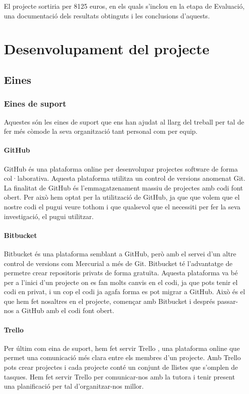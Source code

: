 \documentclass[12pt,a4paper,catalan]{article}
\begin{document}
El projecte sortiria per 8125 euros, en els quals s'inclou en la etapa de Evaluació, una documentació dels resultats obtinguts i les conclusions d'aquests.

\newpage

\section{Desenvolupament del projecte}
\subsection{Eines}
\subsubsection{Eines de suport}
Aquestes són les eines de suport que ens han ajudat al llarg del treball per tal de fer més còmode la seva organització tant personal com per equip.

\paragraph{GitHub}
GitHub \cite{github} és una plataforma online per desenvolupar projectes software de forma col·laborativa. Aquesta plataforma utilitza un control de versions anomenat Git. La finalitat de GitHub és l'emmagatzenament massiu de projectes amb codi font obert. Per això hem optat per la utilització de GitHub, ja que que volem que el nostre codi el pugui veure tothom i que qualsevol que el necessiti per fer la seva investigació, el pugui utilitzar.

\paragraph{Bitbucket}
Bitbucket \cite{bitbucket} és una plataforma semblant a GitHub, però amb el servei d'un altre control de versions com Mercurial a més de Git. Bitbucket té l'advantatge de permetre crear repositoris privats de forma gratuïta. Aquesta plataforma va bé per a l'inici d'un projecte on es fan molts canvis en el codi, ja que pots tenir el codi en privat, i un cop el codi ja agafa forma es pot migrar a GitHub. Això és el que hem fet nosaltres en el projecte, començar amb Bitbucket i després passar-nos a GitHub amb el codi font obert.

\paragraph{Trello}
Per últim com eina de suport, hem fet servir Trello \cite{trello}, una plataforma online que permet una comunicació més clara entre els membres d'un projecte. Amb Trello pots crear projectes i cada projecte conté un conjunt de llistes que s'omplen de tasques. Hem fet servir Trello per comunicar-nos amb la tutora i tenir present una planificació per tal d'organitzar-nos millor.
\end{document}
